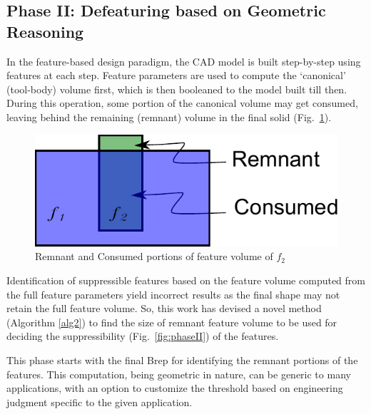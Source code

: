 \begin{minipage}[t]{\linewidth}
\begin{tabular}[h]{@{} p{0.3\linewidth} p{0.3\linewidth}  p{0.3\linewidth}@{}}
\end{tabular}
\label{fig:phaseI}
\end{minipage}



 
\subsection{Phase II: Defeaturing based on Geometric Reasoning} \label{ph2}

In the feature-based design paradigm, the CAD model is built step-by-step using features at each step. Feature parameters are used to compute the ‘canonical’ (tool-body) volume first, which is then booleaned to the model built till then. During this operation, some portion of the canonical volume may get consumed, leaving behind the remaining (remnant) volume in the final solid  (Fig.~\ref{fig_remnant}).

\begin{figure}[!htb]
\centering
 \includegraphics[width=0.35\linewidth]{../Common/images/Solid_Simple_SmallProtrusion.pdf} 
 \caption{Remnant and Consumed portions of feature volume of  $f_2$}
 \label{fig_remnant}
\end{figure}
  
Identification of suppressible features based on the feature volume computed from the full feature parameters yield incorrect results as the final shape may not retain the full feature volume. So, this work has devised a novel method  (Algorithm \ref{alg2}) to find the size of remnant feature volume to be used for deciding the suppressibility  (Fig.~\ref{fig:phaseII}) of the features.

This phase starts with the final Brep for identifying the remnant portions of the features. This computation, being geometric in nature, can be generic to many applications, with an option to customize the threshold based on engineering judgment specific to the given application.


